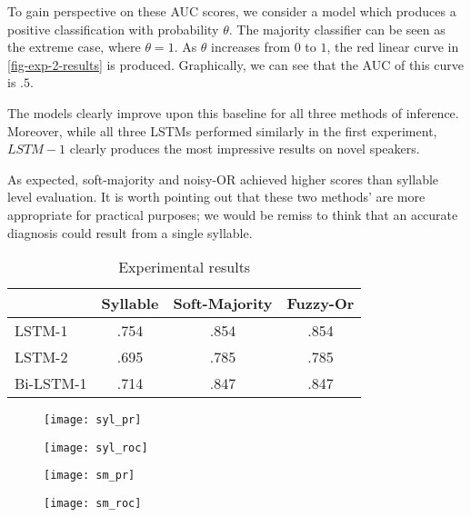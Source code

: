 To gain perspective on these AUC scores, we consider a model which produces a positive classification with probability $\theta$. The majority classifier can be seen as the extreme case, where $\theta = 1$. As $\theta$ increases from $0$ to $1$, the red linear curve in \ref{fig-exp-2-results} is produced. Graphically, we can see that the AUC of this curve is $.5$. 

The models clearly improve upon this baseline for all three methods of inference. Moreover, while all three LSTMs performed similarly in the first experiment, $LSTM-1$ clearly produces the most impressive results on novel speakers. 

As expected, soft-majority and noisy-OR achieved higher scores than syllable level evaluation. It is worth pointing out that these two methods' are more appropriate for practical purposes; we would be remiss to think that an accurate diagnosis could result from a single syllable. 

\begin{table}[h]
\centering
\caption{Experimental results}
\begin{tabular}{|l|c|c|c|}
\hline
\multicolumn{1}{|c|}{}    &   Syllable     &   Soft-Majority         &     Fuzzy-Or         \\ \hline
LSTM-1                      &   .754     &   .854     &     .854       \\ \hline
LSTM-2                      &   .695     &   .785     &     .785       \\ \hline
Bi-LSTM-1                   &   .714     &   .847     &     .847      \\ \hline
\end{tabular}
\label{tab-exp-2-results}
\end{table}


\begin{figure*}[t]
    \centering
    \begin{subfigure}[b]{0.4\textwidth}
        \texttt{[image: syl\_pr]}
        \caption{}
        \label{rfidtest_xaxis}
    \end{subfigure}
    \begin{subfigure}[b]{0.4\textwidth}
        \texttt{[image: syl\_roc]}
        \caption{}
        \label{rfidtest_yaxis}
    \end{subfigure}
    \begin{subfigure}[b]{0.4\textwidth}
        \texttt{[image: sm\_pr]}
        \caption{}
        \label{rfidtest_zaxis}
    \end{subfigure}
    \begin{subfigure}[b]{0.4\textwidth}
        \texttt{[image: sm\_roc]}
        \caption{}
        \label{rfidtest_zaxis}
    \end{subfigure}
    \caption[]{}
    \label{fig-exp-2-results}
\end{figure*}
